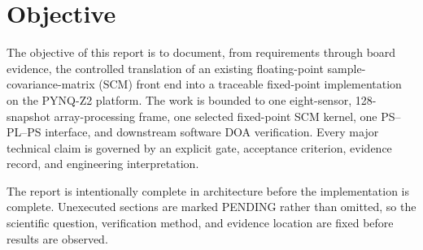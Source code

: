 \chapter*{Objective}

\begin{objective}
The objective of this report is to document, from requirements through board evidence, the
controlled translation of an existing floating-point sample-covariance-matrix (SCM) front
end into a traceable fixed-point implementation on the PYNQ-Z2 platform. The work is
bounded to one eight-sensor, 128-snapshot array-processing frame, one selected fixed-point
SCM kernel, one PS--PL--PS interface, and downstream software DOA verification. Every
major technical claim is governed by an explicit gate, acceptance criterion, evidence record,
and engineering interpretation.
\end{objective}

The report is intentionally complete in architecture before the implementation is complete.
Unexecuted sections are marked PENDING rather than omitted, so the scientific question,
verification method, and evidence location are fixed before results are observed.
